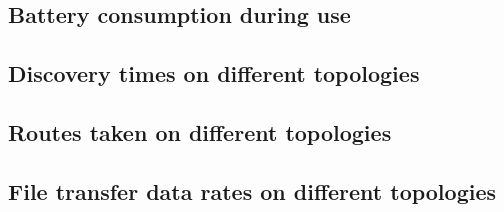 \subsection{Battery consumption during use}

\subsection{Discovery times on different topologies}

\subsection{Routes taken on different topologies}

\subsection{File transfer data rates on different topologies}




